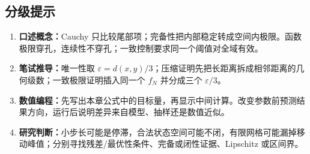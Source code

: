\subsection*{分级提示}
\begingroup\small
\begin{enumerate}[nosep,leftmargin=*]
  \item \textbf{口述概念：}Cauchy 只比较尾部项；完备性把内部稳定转成空间内极限。函数极限穿孔，连续性不穿孔；一致控制要求同一个阈值对全域有效。
  \item \textbf{笔试推导：}唯一性取 $\varepsilon=d(x,y)/3$；压缩证明先把长距离拆成相邻距离的几何级数；一致极限证明插入同一个 $f_N$ 并分成三个 $\varepsilon/3$。
  \item \textbf{数值编程：}先写出本章公式中的目标量，再显示中间计算。改变参数前预测结果方向，运行后说明差异来自模型、抽样还是数值近似。
  \item \textbf{研究判断：}小步长可能是停滞，合法状态空间可能不闭，有限网格可能漏掉移动峰值；分别寻找残差/最优性条件、完备或闭性证据、Lipschitz 或区间界。
\end{enumerate}
\endgroup
